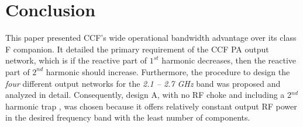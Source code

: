 \documentclass[conference]{IEEEtran}
\begin{document}
\section{Conclusion}
\label{section:Conclusion}
This paper presented CCF's \color{blue} wide operational bandwidth advantage over its class F companion. It detailed the primary requirement of the CCF PA output network, which is \color {black} if the reactive part of $1^{st}$ harmonic decreases, then the reactive part of $2^{nd}$ harmonic should increase. \color{blue} Furthermore, \color{black} the procedure to design the \textit{\color{blue} four \color{black}}different output networks for the \color{blue}\textit{2.1 -- 2.7 GHz} band was \color{black} \color{blue} proposed and analyzed in detail. \color{black} Consequently, \color{black}design A\color {blue}, \color{black} with no RF choke and \color{blue} including a 2$^{nd}$ harmonic trap\color{black} \color {blue}, \color{black}  was chosen because it \color{blue} offers relatively \color{black} constant \color{blue} output RF power \color{black} in the \color{blue} desired frequency band \color{black} with the least number of components.



\end{document}
